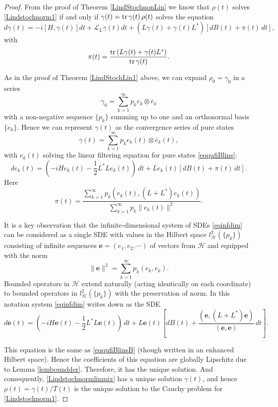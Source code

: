 \documentclass[12pt]{article}
\def\LC{\mathcal{L}}
\def\HC{\mathcal{H}}
\def\e{\mathbf{e}}
\def\tr{\rm{tr}}
\def\ga{\gamma}
\begin{document}
\begin{proof}
From the proof of Theorem \ref{LindStochnonLin} we know that $\rho(t)$ solves \eqref{Lindstochnorm1}
 if and only if $\ga(t)={\tr}\, \ga(t)\, \rho(t)$ solves the equation
  \begin{equation}
\label{Lindstochnormlinmix}
d\ga(t)=-i[H, \ga(t)] dt +\LC_L \ga(t) dt +(L\ga(t)+\ga(t) L^*)
[dB(t)+ \pi(t) \, dt],
\end{equation}
with
\[
\pi(t)=\frac{{\tr} \, (L\ga(t)+\ga(t) L^*)}{{\tr}\, \ga(t)}.
\]

As in the proof of Theorem \ref{LindStochLin1} above, we can
expand $\rho_0=\ga_0$ in a series
\[
 \ga_0=\sum_{k=1}^{\infty} p_k e_k\otimes \bar e_k
 \]
 with a non-negative sequence $\{p_k\}$ summing up to one
 and an orthonormal basis $\{e_k\}$.
Hence we can represent $\ga(t)$ as the convergence series of pure states
 \[
 \ga(t)=\sum_{k=1}^{\infty} p_k e_k(t)\otimes \bar e_k(t),
 \]
 with $e_k(t)$ solving the linear filtering equation for
pure states \eqref{eqqufiBlins}:
\begin{equation}
\label{eqinfdim}
de_k(t)=(-iH e_k(t)-\frac12 L^*L e_k(t))\,dt +Le_k(t) [dB(t)+\pi(t)\, dt].
\end{equation}
Here
\[
\pi(t)=\frac{\sum_{k=1}^{\infty} p_k (e_k(t), (L+L^*) e_k(t))}{\sum_{k=1}^{\infty} p_k \|e_k(t)\|^2}.
\]

It is a key observation that the infinite-dimensional system of SDEs \eqref{eqinfdim}
can be considered as a single SDE
with values in the  Hilbert space $l^2_{\HC}(\{p_k\})$ consisting of infinite sequences
$\e=(e_1, e_2, \cdots )$ of vectors from $\HC$ and equipped
with the norm
\[
\|\e\|^2=\sum_{k=1}^{\infty} p_k (e_k, e_k).
\]
Bounded operators in $\HC$ extend naturally (acting identically on each coordinate)
to bounded operators in $l^2_{\HC}(\{p_k\})$ with the preservation of norm.
In this notation system \eqref{eqinfdim} writes down as the SDE
\begin{equation}
\label{eqinfdim1}
d \e(t)=(-iH \e(t)-\frac12 L^*L \e(t))\, dt +L\e(t) \left[dB(t)+\frac{(\e, (L+L^*) \e)}{(\e, \e)} \, dt\right].
\end{equation}

This equation is the same as \eqref{eqqufiBlinsB} (though written in an enhanced Hilbert space). Hence
the coefficients of this equation are globally Lipschitz due to Lemma \ref{lemboundder}.
Therefore, it has the unique solution. And consequently, \eqref{Lindstochnormlinmix} has a unique solution $\ga(t)$,
and hence  $\rho(t)=\ga(t)/T(t)$ is the unique solution to the Cauchy problem for \eqref{Lindstochnorm1}.
\end{proof}
\end{document}

